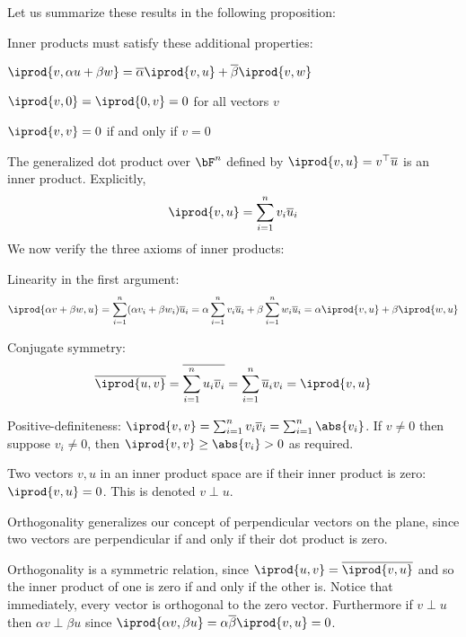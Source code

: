 Let us summarize these results in the following proposition:

\begin{prop*}

    Inner products must satisfy these additional properties:
    \benum
        \item $\iprod{v,\alpha u+\beta w}=\overline\alpha\iprod{v,u}+\overline\beta\iprod{v,w}$
        \item $\iprod{v,0}=\iprod{0,v}=0$ for all vectors $v$
        \item $\iprod{v,v}=0$ if and only if $v=0$
    \eenum

\end{prop*}

\begin{exam*}

    The generalized dot product over $\bF^n$ defined by $\iprod{v,u}=v^\top\overline u$ is an inner product.
    Explicitly,
    \[ \iprod{v,u} = \sum_{i=1}^n v_i\overline u_i \]
    We now verify the three axioms of inner products:
    \benum
        \item Linearity in the first argument:
            \[ \iprod{\alpha v+\beta w,u} = \sum_{i=1}^n (\alpha v_i+\beta w_i)\overline u_i = \alpha\sum_{i=1}^nv_i\overline u_i + \beta\sum_{i=1}^nw_i\overline u_i = \alpha\iprod{v,u} + \beta\iprod{w,u} \]
        \item Conjugate symmetry:
            \[ \overline{\iprod{u,v}} = \overline{\sum_{i=1}^n u_i\overline v_i} = \sum_{i=1}^n\overline u_iv_i = \iprod{v,u} \]
        \item Positive-definiteness: $\iprod{v,v}=\sum_{i=1}^nv_i\overline v_i=\sum_{i=1}^n\abs{v_i}$.
            If $v\neq0$ then suppose $v_i\neq0$, then $\iprod{v,v}\geq\abs{v_i}>0$ as required.
    \eenum

\end{exam*}

\begin{defn*}

    Two vectors $v,u$ in an inner product space are  if their inner product is zero: $\iprod{v,u}=0$.
    This is denoted $v\perp u$.

\end{defn*}

Orthogonality generalizes our concept of perpendicular vectors on the plane, since two vectors are perpendicular if and only if their dot product is zero.

Orthogonality is a symmetric relation, since $\iprod{u,v}=\overline{\iprod{v,u}}$ and so the inner product of one is zero if and only if the other is.
Notice that immediately, every vector is orthogonal to the zero vector.
Furthermore if $v\perp u$ then $\alpha v\perp\beta u$ since $\iprod{\alpha v,\beta u}=\alpha\overline\beta\iprod{v,u}=0$.

